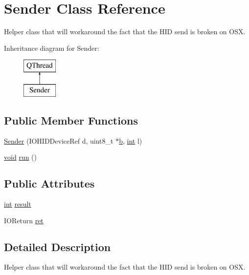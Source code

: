 \hypertarget{class_sender}{\section{Sender Class Reference}
\label{class_sender}
}


Helper class that will workaround the fact that the H\-I\-D send is broken on O\-S\-X.  


Inheritance diagram for Sender\-:\begin{figure}[H]
\begin{center}
\leavevmode
\includegraphics[height=2.000000cm]{class_sender}
\end{center}
\end{figure}
\subsection*{Public Member Functions}
\begin{DoxyCompactItemize}
\item 
\hyperlink{class_sender_a19eb078b590743ee8d1fc06f23bca1a1}{Sender} (I\-O\-H\-I\-D\-Device\-Ref d, uint8\-\_\-t $\ast$\hyperlink{glext_8h_a6eba317e3cf44d6d26c04a5a8f197dcb}{b}, \hyperlink{ioapi_8h_a787fa3cf048117ba7123753c1e74fcd6}{int} l)
\item 
\hyperlink{group___u_a_v_objects_plugin_ga444cf2ff3f0ecbe028adce838d373f5c}{void} \hyperlink{class_sender_a958fef41c40a128fafd2603d53602b5e}{run} ()
\end{DoxyCompactItemize}
\subsection*{Public Attributes}
\begin{DoxyCompactItemize}
\item 
\hyperlink{ioapi_8h_a787fa3cf048117ba7123753c1e74fcd6}{int} \hyperlink{class_sender_ad94f4ce0c27858f3f34e11a4d97f6f1d}{result}
\item 
I\-O\-Return \hyperlink{class_sender_aff1c122c343fa8ae82aa5b36ae2a17a7}{ret}
\end{DoxyCompactItemize}


\subsection{Detailed Description}
Helper class that will workaround the fact that the H\-I\-D send is broken on O\-S\-X. 


